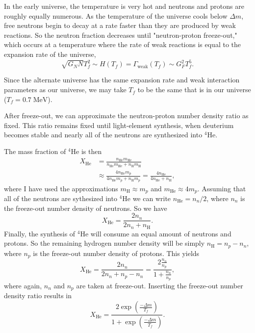\documentclass[%
 reprint,
 amsmath,amssymb,
 aps,
]{revtex4-1}
\begin{document}
In the early universe, the temperature is very hot and neutrons and protons are roughly equally numerous. As the temperature of the universe cools below $\Delta m$, free neutrons begin to decay at a rate faster than they are produced by weak reactions. So the neutron fraction decreases until "neutron-proton freeze-out," which occurs at a temperature where the rate of weak reactions is equal to the expansion rate of the universe,\cite{CAMPBELL1995429}
\begin{equation}
	\sqrt{G_N N} T_f^2 \sim H(T_f) = \Gamma_\text{weak} (T_f) \sim G_F^2 T_f^5.
\end{equation}

Since the alternate universe has the same expansion rate and weak interaction parameters as our universe, we may take $T_f$ to be the same that is in our universe ($T_f = 0.7\; \text{MeV}$).

After freeze-out, we can approximate the neutron-proton number density ratio as fixed. This ratio remains fixed until light-element synthesis, when deuterium becomes stable and nearly all of the neutrons are synthesized into ${}^4\text{He}$.\cite{PhysRevD.65.123511}

The mass fraction of ${}^4\text{He}$ is then
\begin{align}
	X_\text{He} &= 
	\frac{n_\text{He} m_\text{He}}{n_\text{He} m_\text{He} + n_\text{H} m_\text{H}} \\
	&\approx \frac{4 n_\text{He} m_p}{4 n_\text{He} m_p + n_\text{H} m_p}
	= \frac{4 n_\text{He}}{4 n_\text{He} + n_\text{H}},
\end{align}
where I have used the approximations $m_\text{H} \approx m_p$ and $m_\text{He} \approx 4 m_p$. Assuming that all of the neutrons are sythesized into ${}^4\text{He}$ we can write $n_\text{He} = n_n / 2$, where $n_n$ is the freeze-out number density of neutrons. So we have
\begin{equation}
	X_\text{He} = \frac{2 n_n}{2 n_n + n_\text{H}}.
\end{equation}
Finally, the synthesis of ${}^4\text{He}$ will consume an equal amount of neutrons and protons. So the remaining hydrogen number density will be simply $n_\text{H} = n_p - n_n$, where $n_p$ is the freeze-out number density of protons. This yields
\begin{equation}
	X_\text{He} = \frac{2 n_n}{2 n_n + n_p - n_n}
	= \frac{2 \frac{n_n}{n_p}}{1 + \frac{n_n}{n_p}},
\end{equation}
where again, $n_n$ and $n_p$ are taken at freeze-out. Inserting the freeze-out number density ratio results in
\begin{equation}
	X_\text{He} =
	\frac{2 \exp \left( \frac{- \Delta m}{T_f} \right)}{1 + \exp \left( \frac{- \Delta m}{T_f} \right)}.
\end{equation}
\end{document}
